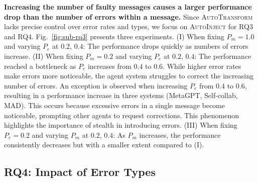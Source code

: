 \documentclass{article}
\theoremstyle{plain}
\theoremstyle{definition}
\theoremstyle{remark}
\begin{document}
\textbf{Increasing the number of faulty messages causes a larger performance drop than the number of errors within a message.}
Since \textsc{AutoTransform} lacks precise control over error rates and types, we focus on \textsc{AutoInject} for RQ3 and RQ4.
Fig.~\ref{fig:sub-rq3} presents three experiments.
(I) When fixing $P_m=1.0$ and varying $P_e$ at $0.2$, $0.4$: The performance drops quickly as numbers of errors increase.
(II) When fixing $P_m=0.2$ and varying $P_e$ at $0.2$, $0.4$: The performance reached a bottleneck as $P_e$ increases from $0.4$ to $0.6$.
While higher error rates make errors more noticeable, the agent system struggles to correct the increasing number of errors.
An exception is observed when increasing $P_e$ from $0.4$ to $0.6$, resulting in a performance increase in three systems (MetaGPT, Self-collab, MAD).
This occurs because excessive errors in a single message become noticeable, prompting other agents to request corrections.
This phenomenon highlights the importance of stealth in introducing errors.
(III) When fixing $P_e=0.2$ and varying $P_m$ at $0.2$, $0.4$: As $P_m$ increases, the performance consistently decreases but with a smaller extent compared to (I).

\begin{table}[t]
    \centering
    \caption{Scenarios—tasks, error-introducing methods, multi-agent systems, and backbone LLMs—where the incorporation of faulty agents can improve overall performance.}
    \label{tab:increase}
\end{table}

\subsection{RQ4: Impact of Error Types}
\label{sec:rq4}
\end{document}
